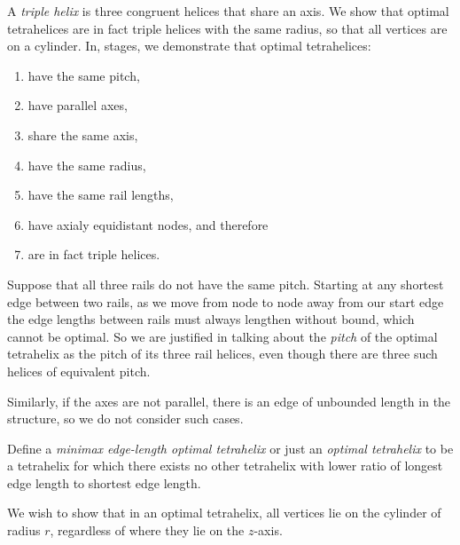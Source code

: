 \documentclass[review]{siamonline1116}
\begin{document}
A \emph{triple helix} is three congruent helices that share an axis. We show that
optimal tetrahelices are in fact triple helices with the same radius, so that all
vertices are on a cylinder. In, stages, we demonstrate that optimal tetrahelices:
\begin{enumerate}
\item have the same pitch,
\item have parallel axes,
\item share the same axis,
\item have the same radius,
  \item have the same rail lengths,
  \item have axialy equidistant nodes, and therefore
  \item are in fact triple helices.
\end{enumerate}

Suppose that all three rails do not have the same pitch. Starting at any shortest edge between
two rails, as we move
from node to node away from our start edge the edge lengths
between rails must always lengthen without bound,
which cannot be optimal.
So we are justified in talking about the
\emph{pitch} of 
the optimal tetrahelix as the pitch of its three rail helices, even though there are
three such helices of equivalent pitch.

Similarly, if the axes are not parallel, there is an edge of
unbounded length in the structure, so we do not consider such cases.

Define a \emph{minimax edge-length optimal tetrahelix} or just an
\emph{optimal tetrahelix} to be a tetrahelix for which there exists
no other tetrahelix with lower ratio of longest edge length to shortest edge length.

We wish to show that in an optimal tetrahelix, all vertices lie on the cylinder
of radius $r$, regardless of where they lie on the $z$-axis.

\end{document}
